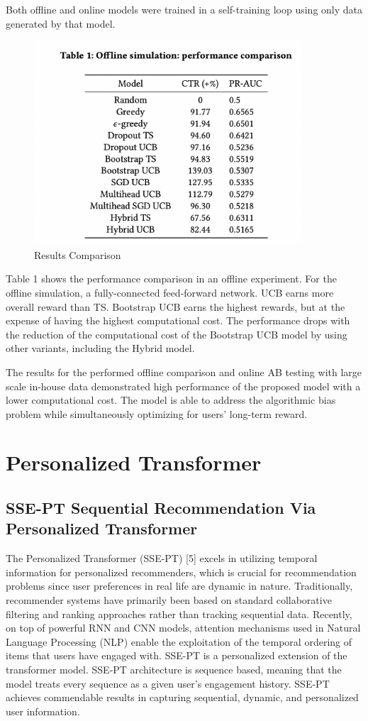 Both offline and online models were trained in a self-training loop using only data generated by that model. 

\begin{figure}[hh!]
    \centering
    \includegraphics[width=100mm]{bandits_results.png}
    \caption{Results Comparison
    \label{overflow}}
\end{figure}

Table 1 shows the performance comparison in an offline experiment. For the offline simulation, a fully-connected feed-forward network. UCB earns more overall reward than TS. Bootstrap UCB earns the highest rewards, but at the expense of having the highest computational cost. The performance drops with the reduction of
the computational cost of the Bootstrap UCB model by using other
variants, including the Hybrid model.

The results for the performed offline comparison
and online AB testing with large scale in-house data demonstrated high performance of the proposed model with a lower computational
cost. The model is able to address the algorithmic bias problem while simultaneously optimizing for users' long-term reward. 

\chapter{Personalized Transformer}
\section{SSE-PT Sequential Recommendation Via Personalized Transformer}

The Personalized Transformer (SSE-PT) [5] excels in utilizing temporal information for personalized recommenders, which is crucial for recommendation problems since user preferences in real life are dynamic in nature. Traditionally, recommender systems have primarily been based on standard collaborative filtering and ranking approaches rather than tracking sequential data. Recently, on top of powerful RNN and CNN models, attention mechanisms used in Natural Language Processing (NLP) enable the exploitation of the temporal ordering of items that users have engaged with. SSE-PT is a personalized extension of the transformer model. SSE-PT architecture is sequence based, meaning that the model treats every sequence  as a given user's engagement history. SSE-PT achieves commendable results in capturing sequential, dynamic, and personalized user information.

